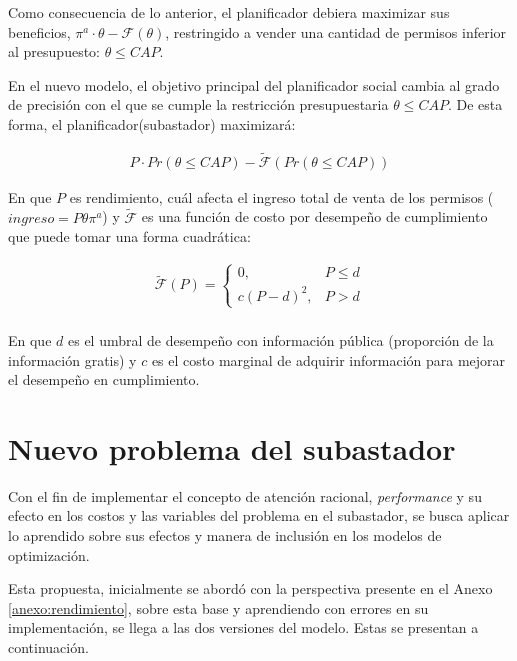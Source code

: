 Como consecuencia de lo anterior, el planificador debiera maximizar sus beneficios, $\pi^a\cdot\theta-\mathcal{F}(\theta)$, restringido a vender una cantidad de permisos inferior al presupuesto: $\theta\leq CAP$.
\vspace{2.5mm}


En el nuevo modelo, el objetivo principal del planificador social cambia al grado de precisión con el que se cumple la restricción presupuestaria $\theta\leq CAP$. De esta forma, el planificador(subastador) maximizará:

\begin{align}
P\cdot Pr(\theta\leq CAP)-\tilde{\mathcal{F}}(Pr(\theta\leq CAP)) \label{nuevafposible}    
\end{align}


En que $P$ es rendimiento, cuál afecta el ingreso total de venta de los permisos ($ingreso = P\theta \pi^a$) y $\tilde{\mathcal{F}}$ es una función de costo por desempeño de cumplimiento que puede tomar una forma cuadrática:

\begin{equation}
\begin{array}{rrclcl}
    \tilde{\mathcal{F}}(P)=\begin{cases}0,&P\leq d\\c(P-d)^2,&P>d\end{cases}\label{costoperformace}\\
\end{array}
\end{equation}

En que $d$ es el umbral de desempeño con información pública (proporción de la información gratis) y $c$ es el costo marginal de adquirir información para mejorar el desempeño en cumplimiento.
\vspace{2.5mm}


\section{Nuevo problema del subastador}

 Con el fin de implementar el concepto de atención racional, \textit{performance} y su efecto en los costos y las variables del problema en el subastador, se busca aplicar lo aprendido sobre sus efectos y manera de inclusión en los modelos de optimización.
\vspace{2.5mm} 

Esta propuesta, inicialmente se abordó con la perspectiva presente en el Anexo \ref{anexo:rendimiento}, sobre esta base y aprendiendo con errores en su implementación, se llega a las dos versiones del modelo. Estas se presentan a continuación.

